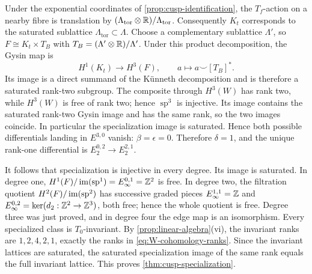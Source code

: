 Under the exponential coordinates of
\cref{prop:cusp-identification}, the $T_f$-action on a nearby fibre is
translation by
$(\Lambda_{\mathrm{tor}}\otimes\mathbb R)/\Lambda_{\mathrm{tor}}$.
Consequently $K_t$ corresponds to the saturated sublattice
$\Lambda_{\mathrm{tor}}\subset\Lambda$.  Choose a complementary
sublattice $\Lambda'$, so
$F\cong K_t\times T_B$ with
$T_B=(\Lambda'\otimes\mathbb R)/\Lambda'$.  Under this product decomposition,
the Gysin map is
\[
 H^1(K_t)\longrightarrow H^3(F),
 \qquad a\longmapsto a\smile[T_B]^*.
\]
Its image is a direct summand of the Künneth decomposition and is therefore
a saturated rank-two subgroup.  The composite through $H^3(W)$ has rank
two, while $H^3(W)$ is free of rank two; hence
$\operatorname{sp}^3$ is injective.  Its image contains the saturated
rank-two Gysin image and has the same rank, so the two images coincide.
In particular the specialization image is saturated.  Hence both
possible differentials landing in $E^{3,0}$ vanish:
$\beta=\epsilon=0$.  Therefore $\delta=1$, and the unique rank-one
differential is $E_2^{0,2}\to E_2^{2,1}$.

It follows that specialization is injective in every degree.  Its image is
saturated.  In degree one,
$H^1(F)/\operatorname{im}(\operatorname{sp}^1)=E_\infty^{0,1}=\mathbb Z^2$ is free.  In
degree two, the filtration quotient
$H^2(F)/\operatorname{im}(\operatorname{sp}^2)$ has successive graded pieces
$E_\infty^{1,1}=\mathbb Z$ and
$E_\infty^{0,2}=\ker(d_2:\mathbb Z^2\to\mathbb Z^3)$, both free; hence the whole
quotient is free.  Degree three was just proved, and in degree four the
edge map is an isomorphism.  Every specialized class is $T_0$-invariant.
By
\cref{prop:linear-algebra}(vi), the invariant ranks are
$1,2,4,2,1$, exactly the ranks in \eqref{eq:W-cohomology-ranks}.  Since the
invariant lattices are saturated, the saturated specialization image of
the same rank equals the full invariant lattice.  This proves
\cref{thm:cusp-specialization}.

